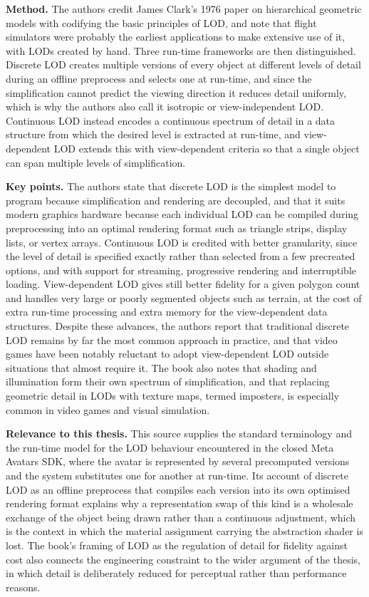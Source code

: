 \documentclass[11pt, a4paper]{article}
\begin{document}
\textbf{Method.} The authors credit James Clark's 1976 paper on hierarchical geometric models with codifying the basic principles of LOD, and note that flight simulators were probably the earliest applications to make extensive use of it, with LODs created by hand. Three run-time frameworks are then distinguished. Discrete LOD creates multiple versions of every object at different levels of detail during an offline preprocess and selects one at run-time, and since the simplification cannot predict the viewing direction it reduces detail uniformly, which is why the authors also call it isotropic or view-independent LOD. Continuous LOD instead encodes a continuous spectrum of detail in a data structure from which the desired level is extracted at run-time, and view-dependent LOD extends this with view-dependent criteria so that a single object can span multiple levels of simplification.

\textbf{Key points.} The authors state that discrete LOD is the simplest model to program because simplification and rendering are decoupled, and that it suits modern graphics hardware because each individual LOD can be compiled during preprocessing into an optimal rendering format such as triangle strips, display lists, or vertex arrays. Continuous LOD is credited with better granularity, since the level of detail is specified exactly rather than selected from a few precreated options, and with support for streaming, progressive rendering and interruptible loading. View-dependent LOD gives still better fidelity for a given polygon count and handles very large or poorly segmented objects such as terrain, at the cost of extra run-time processing and extra memory for the view-dependent data structures. Despite these advances, the authors report that traditional discrete LOD remains by far the most common approach in practice, and that video games have been notably reluctant to adopt view-dependent LOD outside situations that almost require it. The book also notes that shading and illumination form their own spectrum of simplification, and that replacing geometric detail in LODs with texture maps, termed imposters, is especially common in video games and visual simulation.

\textbf{Relevance to this thesis.} This source supplies the standard terminology and the run-time model for the LOD behaviour encountered in the closed Meta Avatars SDK, where the avatar is represented by several precomputed versions and the system substitutes one for another at run-time. Its account of discrete LOD as an offline preprocess that compiles each version into its own optimised rendering format explains why a representation swap of this kind is a wholesale exchange of the object being drawn rather than a continuous adjustment, which is the context in which the material assignment carrying the abstraction shader is lost. The book's framing of LOD as the regulation of detail for fidelity against cost also connects the engineering constraint to the wider argument of the thesis, in which detail is deliberately reduced for perceptual rather than performance reasons.
\end{document}
